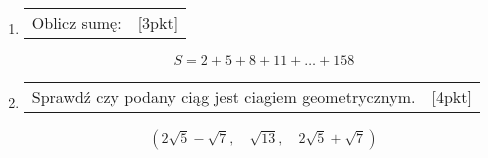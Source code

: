 \documentclass[12pt,a4paper]{article}
\begin{document}
\begin{enumerate}[1.]
	\item \begin{tabular}{p{13cm} r}
		Oblicz sumę:&[3pkt]\\
	\end{tabular}
	$$S=2+5+8+11+\dots + 158$$ 
	
	\item \begin{tabular}{p{13cm} r}
		Sprawdź czy podany ciąg jest ciagiem geometrycznym.&[4pkt]\\ 
	\end{tabular}
	$$(2\sqrt{5}-\sqrt{7},\quad \sqrt{13}, \quad 2\sqrt{5}+\sqrt{7})$$

	\end{enumerate}
	
\end{document}
